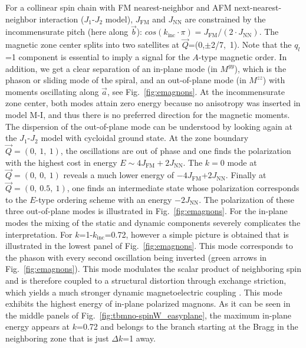\documentclass[aps,prb,twocolumn,superscriptaddress,showpacs,floatfix]{revtex4-2}
\newcommand{\aaxis}{$\vec{a}$}
\newcommand{\baxis}{$\vec{b}$}
\begin{document}
For a collinear spin chain with FM nearest-neighbor and AFM next-nearest-neighbor interaction ($J_1$-$J_2$ model), $J_{\textrm{FM}}$ and $J_{\textrm{NN}}$ are constrained by the incommensurate pitch (here along \baxis ): $cos(k_{\textrm{inc}}\cdot\pi)=J_{\textrm{FM}}/(2\cdot J_{\textrm{NN}})$. The magnetic zone center splits into two satellites at $\vec{Q}$=(0,$\pm$2/7,~1). Note that the $q_l$=1 component is essential to imply a signal for the $A$-type magnetic order.
In addition, we get a clear separation of an in-plane mode (in $M^{yy}$), which is the phason or sliding mode of the spiral, and an out-of-plane mode (in $M^{zz}$) with moments oscillating along \aaxis , see Fig.~\ref{fig:emagnons}. At the incommensurate zone center, both modes attain zero energy because no anisotropy was inserted in model M-I, and thus there is no preferred direction for the magnetic moments.  The dispersion of the out-of-plane mode can be understood by looking again at the $J_1$-$J_2$ model with cycloidal ground state. At the zone boundary $\vec{Q}=(0,~1,~1)$, the oscillations are out of phase and one finds the polarization with the highest cost in energy $E\sim 4J_{\textrm{FM}}+2J_{\textrm{NN}}$. The $k=0$ mode at $\vec{Q}=(0,~0,~1)$ reveals a much lower energy of $-4J_{\textrm{FM}}$+$2J_{\textrm{NN}}$.
Finally at $\vec{Q}=(0,~0.5,~1)$, one finds an intermediate state whose polarization corresponds to the $E$-type ordering scheme with an energy $-2J_{\textrm{NN}}$.
The polarization of these three out-of-plane modes is illustrated in Fig.~\ref{fig:emagnons}.
For the in-plane modes the mixing of the static and dynamic components severely complicates the interpretation. For $k$=1-$k_{\textrm{inc}}$=0.72, however a
simple picture is obtained that is illustrated in the lowest panel of Fig.~\ref{fig:emagnons}. This mode corresponds to the phason with every second oscillation being inverted
(green arrows in Fig.~\ref{fig:emagnons}). This mode modulates the scalar product of neighboring spin and is therefore coupled to a structural distortion through exchange
striction, which yields a much stronger dynamic magnetoelectric coupling \cite{ValdesAguilar2009}. This mode
exhibits the highest energy of in-plane polarized magnons.
As it can be seen in the middle panels of Fig.~\ref{fig:tbmno-spinW_easyplane}, the maximum in-plane energy appears at $k$=0.72 and belongs to the branch starting at the Bragg in the neighboring zone that is just $\Delta k$=1 away.
\end{document}
